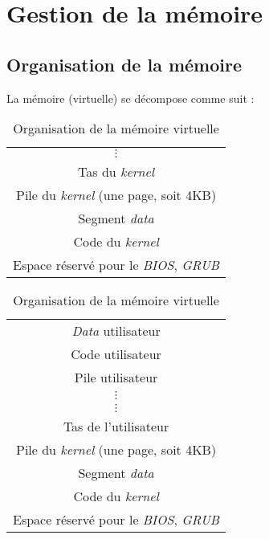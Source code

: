 \documentclass[a4paper, 10pt, french]{article}
\newcommand{\foreign}[1]{\emph{#1}}
\begin{document}
\clearpage
\section{Gestion de la mémoire}

\subsection{Organisation de la mémoire}

La mémoire (virtuelle) se décompose comme suit :
\begin{table}[H]
 \centering
 \begin{subtable}[h]{.5\linewidth}
 \centering
 \begin{tabular}{|c|}
 \hline
 $\vdots$ \\
 Tas du \foreign{kernel} \\
 \hline
 Pile du \foreign{kernel} (une page, soit 4KB) \\
 Segment \foreign{data} \\
 Code du \foreign{kernel} \\
 \hline
 Espace réservé pour le \foreign{BIOS}, \foreign{GRUB} \\
 \hline
\end{tabular}
\caption{Espace mémoire du noyau}
\end{subtable}


\begin{subtable}[h]{.5\linewidth}
 \centering
 \begin{tabular}{|c|}
  \hline
 \foreign{Data} utilisateur \\
 Code utilisateur \\
 \hline
 Pile utilisateur \\
 $\vdots$ \\
 \hline
 $\vdots$ \\
 Tas de l'utilisateur \\
 \hline
 Pile du \foreign{kernel} (une page, soit 4KB) \\
 Segment \foreign{data} \\
 Code du \foreign{kernel} \\
 \hline
 Espace réservé pour le \foreign{BIOS}, \foreign{GRUB} \\
 \hline
 \end{tabular}

 \caption{Espace mémoire de l'utilisateur}
\end{subtable}
\caption{Organisation de la mémoire virtuelle}
\end{table}
\end{document}
